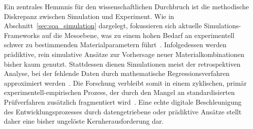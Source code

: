 Ein zentrales Hemmnis für den wissenschaftlichen Durchbruch ist die methodische Diskrepanz zwischen Simulation und Experiment. Wie in Abschnitt~\ref{sec:soa_simulation} dargelegt, fokussieren sich aktuelle Simulations-Frameworks auf die Mesoebene, was zu einem hohen Bedarf an experimentell schwer zu bestimmenden Materialparametern führt~\cite{Carlstedt2022b}. Infolgedessen werden prädiktive, rein simulative Ansätze zur Vorhersage neuer Materialkombinationen bisher kaum genutzt. Stattdessen dienen Simulationen meist der retrospektiven Analyse, bei der fehlende Daten durch mathematische Regressionsverfahren approximiert werden~\cite{Carlstedt2022a, Carlstedt2023}. Die Forschung verbleibt somit in einem zyklischen, primär experimentell-empirischen Prozess, der durch den Mangel an standardisierten Prüfverfahren zusätzlich fragmentiert wird~\cite{Greenhalgh2024a}. Eine echte digitale Beschleunigung des Entwicklungsprozesses durch datengetriebene oder prädiktive Ansätze stellt daher eine bisher ungelöste Kernherausforderung dar.

